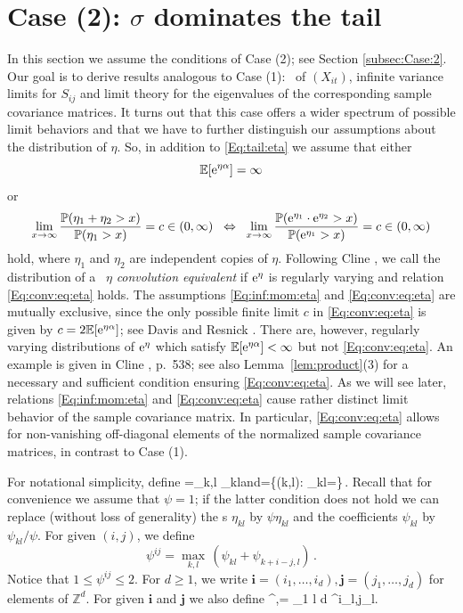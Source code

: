 \section{Case (2): $\sigma$ dominates the tail}\label{Sec:case2}\setcounter{equation}{0}
In this section we assume the conditions of Case (2); see Section \ref{subsec:Case:2}. Our goal is to derive results analogous to Case (1): \regvar\ 
of $(X_{it})$, infinite variance limits for $S_{ij}$ and limit theory for the eigenvalues of the corresponding sample 
covariance matrices. It turns out that this case offers a wider spectrum of possible limit behaviors and that we have to further distinguish our assumptions about the distribution of $\eta$. So, in addition to \eqref{Eq:tail:eta} we assume that either
\begin{equation}\label{Eq:inf:mom:eta} {\mathbb E}[{\rm e}^{\eta \alpha}]=\infty\end{equation}
or 
\begin{equation}\label{Eq:conv:eq:eta} \lim_{x \to \infty}\frac{{\mathbb P}(\eta_1+\eta_2>x)}{{\mathbb P}(\eta_1>x)}=c \in (0,\infty) \;\; \Leftrightarrow\;\; \lim_{x \to \infty}\frac{{\mathbb P}({\rm e}^{\eta_1}\cdot {\rm e}^{\eta_2}>x)}{{\mathbb P}({\rm e}^{\eta_1}>x)}=c \in (0,\infty)\end{equation}
hold, where $\eta_1$ and $\eta_2$ are independent copies of $\eta$.
\bre Following  Cline \cite{cline:1986}, we call 
the distribution of a \rv\ $\eta$ {\it convolution equivalent} if  ${\rm e}^\eta$ is regularly varying and
relation \eqref{Eq:conv:eq:eta} holds. The assumptions \eqref{Eq:inf:mom:eta} and \eqref{Eq:conv:eq:eta} are mutually exclusive, since the only possible finite limit $c$ in \eqref{Eq:conv:eq:eta} is given by $c=2{\mathbb E}[{\rm e}^{\eta \alpha}]$; see Davis and Resnick \cite{davis:resnick:1986}. There are, however, 
regularly varying distributions of ${\rm e}^\eta$ which satisfy ${\mathbb E}[{\rm e}^{\eta \alpha}]<\infty$ but not
\eqref{Eq:conv:eq:eta}. An example is given in Cline \cite{cline:1986}, p.\ 538;  see also Lemma~\ref{lem:product}(3) 
for a necessary and sufficient condition ensuring \eqref{Eq:conv:eq:eta}.
\ere
As we will see later, relations \eqref{Eq:inf:mom:eta} and \eqref{Eq:conv:eq:eta} cause
rather distinct limit behavior of the sample covariance matrix. In particular, \eqref{Eq:conv:eq:eta}
allows for non-vanishing off-diagonal elements of the normalized sample  covariance matrices, in contrast to Case (1). 
\par
For notational simplicity, define
\beao
\psi=\max_{k,l} \psi_{kl}\qquad \mbox{and}\qquad \Lambda=\{(k,l): \psi_{kl}=\psi\}\,.
\eeao
Recall that for convenience we assume that $\psi=1$; if the latter condition does not hold we can replace  
(without loss of generality) the \rv s $\eta_{kl}$ by $\psi \eta_{kl}$ and the coefficients $\psi_{kl}$ by $\psi_{kl}/\psi$.
For given $(i,j)$, we define 
\begin{equation} \label{eq:psi:ij:def}
\psi^{ij}= \max_{k,l}\, (\psi_{kl}+\psi_{k+i-j,l})\,.
\end{equation}
Notice that $1\le \psi^{ij}\le 2$. For $d\ge 1$, we write $\mathbf{i}=(i_1, \ldots, i_d), \mathbf{j}=(j_1, \ldots, j_d)$ for elements of $\mathbb{Z}^d$. For given  $\mathbf{i}$ and  $\mathbf{j}$ we also define
\beao
\psi^{,}= \max_{1 \leq l \leq d} \psi^{i_l,j_l}.
\eeao
 

